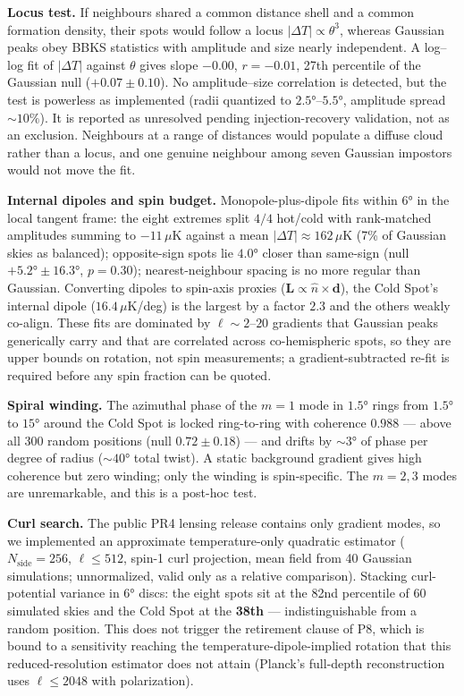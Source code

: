 \documentclass[
]{article}
\begin{document}
\textbf{Locus test.} If neighbours shared a common distance shell and a
common formation density, their spots would follow a locus
\(|\Delta T| \propto \theta^3\), whereas Gaussian peaks obey BBKS
statistics with amplitude and size nearly independent. A log--log fit of
\(|\Delta T|\) against \(\theta\) gives slope \(-0.00\), \(r = -0.01\),
27th percentile of the Gaussian null (\(+0.07 \pm 0.10\)). No
amplitude--size correlation is detected, but the test is powerless as
implemented (radii quantized to \(2.5°\)--\(5.5°\), amplitude spread
\(\sim\!10\%\)). It is reported as unresolved pending injection-recovery
validation, not as an exclusion. Neighbours at a range of distances
would populate a diffuse cloud rather than a locus, and one genuine
neighbour among seven Gaussian impostors would not move the fit.

\textbf{Internal dipoles and spin budget.} Monopole-plus-dipole fits
within \(6°\) in the local tangent frame: the eight extremes split
\(4/4\) hot/cold with rank-matched amplitudes summing to \(-11\,\mu\)K
against a mean \(|\Delta T| \approx 162\,\mu\)K (7\% of Gaussian skies
as balanced); opposite-sign spots lie \(4.0°\) closer than same-sign
(null \(+5.2° \pm 16.3°\), \(p = 0.30\)); nearest-neighbour spacing is
no more regular than Gaussian. Converting dipoles to spin-axis proxies
(\(\mathbf{L} \propto \hat{n} \times \mathbf{d}\)), the Cold Spot's
internal dipole (\(16.4\,\mu\)K/deg) is the largest by a factor \(2.3\)
and the others weakly co-align. These fits are dominated by
\(\ell \sim 2\)--\(20\) gradients that Gaussian peaks generically carry
and that are correlated across co-hemispheric spots, so they are upper
bounds on rotation, not spin measurements; a gradient-subtracted re-fit
is required before any spin fraction can be quoted.

\textbf{Spiral winding.} The azimuthal phase of the \(m = 1\) mode in
\(1.5°\) rings from \(1.5°\) to \(15°\) around the Cold Spot is locked
ring-to-ring with coherence \(0.988\) --- above all 300 random positions
(null \(0.72 \pm 0.18\)) --- and drifts by \(\sim\!3°\) of phase per
degree of radius (\(\sim\!40°\) total twist). A static background
gradient gives high coherence but zero winding; only the winding is
spin-specific. The \(m = 2, 3\) modes are unremarkable, and this is a
post-hoc test.

\textbf{Curl search.} The public PR4 lensing release contains only
gradient modes, so we implemented an approximate temperature-only
quadratic estimator (\(N_{\text{side}} = 256\), \(\ell \leq 512\),
spin-1 curl projection, mean field from 40 Gaussian simulations;
unnormalized, valid only as a relative comparison). Stacking
curl-potential variance in \(6°\) discs: the eight spots sit at the 82nd
percentile of 60 simulated skies and the Cold Spot at the \textbf{38th}
--- indistinguishable from a random position. This does not trigger the
retirement clause of P8, which is bound to a sensitivity reaching the
temperature-dipole-implied rotation that this reduced-resolution
estimator does not attain (Planck's full-depth reconstruction uses
\(\ell \leq 2048\) with polarization).
\end{document}
